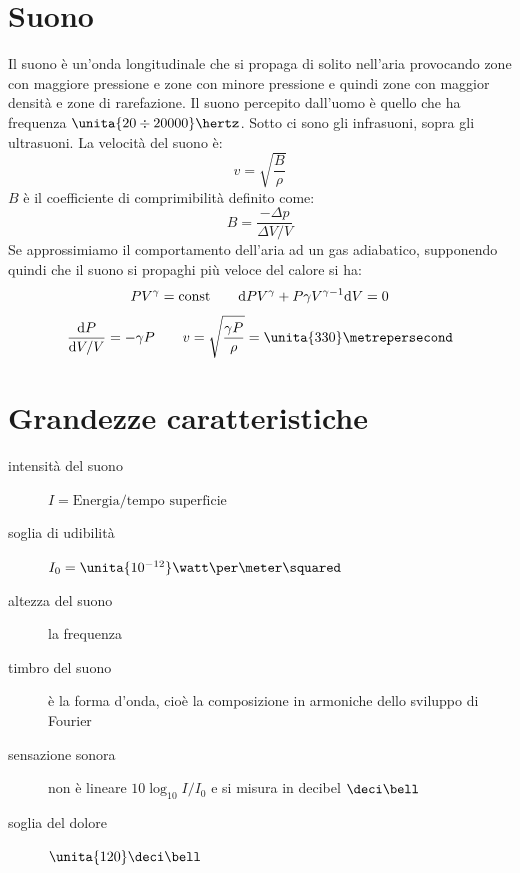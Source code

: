 \section{Suono}
Il suono è un'onda longitudinale che si propaga di solito nell'aria provocando zone con maggiore pressione e zone con minore pressione e quindi zone con maggior densità e zone di rarefazione. Il suono percepito dall'uomo è quello che ha frequenza $\unita{20\div20000}\hertz$. Sotto ci sono gli infrasuoni, sopra gli ultrasuoni. La velocità del suono è:
\begin{equation}
v=\sqrt{\frac{B}{\rho}}
\end{equation}
$B$ è il coefficiente di comprimibilità definito come:
\begin{equation}
B=\frac{-\Delta p}{\Delta V/V}
\end{equation}
Se approssimiamo il comportamento dell'aria ad un gas adiabatico, supponendo quindi che il suono si propaghi più veloce del calore si ha:
$$PV^\gamma=\text{const}\qquad \mathrm{d} PV^\gamma+P\gamma V^{\gamma-1}\mathrm{d} V=0$$
$$\frac{\ud P}{\ud V/V}=-\gamma P\qquad v=\sqrt{\frac{\gamma P}{\rho}}=\unita{330}\metrepersecond$$
\section{Grandezze caratteristiche}
\begin{description}
\item[intensità del suono] $I=\text{Energia}/\text{tempo superficie}$\\
\item[soglia di udibilità] $I_0=\unita{10^{-12}}\watt\per\meter\squared$\\
\item[altezza del suono]la frequenza\\
\item[timbro del suono] è la forma d'onda, cioè la composizione in armoniche dello sviluppo di Fourier\\
\item[sensazione sonora] non è lineare $10\log_{10} I/I_0$ e si misura in decibel $\deci\bell$\\
\item[soglia del dolore] $\unita{120}\deci\bell$\\
\end{description}




























